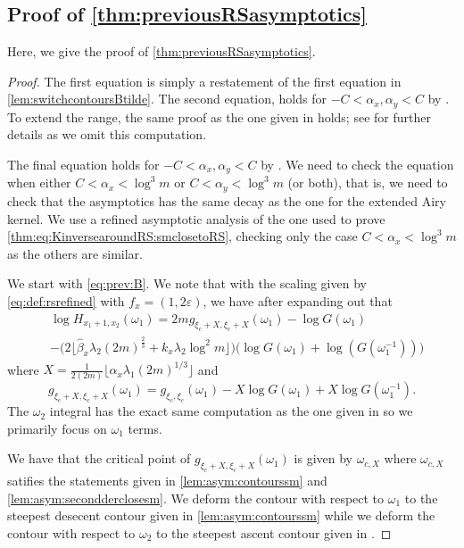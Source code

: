 \documentclass[11pt,twoside]{amsart}
\theoremstyle{plain}
\numberwithin{quest}{section}
\theoremstyle{remark}
\numberwithin{rem}{section}
\theoremstyle{definition}
\newcommand{\eps}{\varepsilon}
\begin{document}
	\subsection{Proof of \cref{thm:previousRSasymptotics}}
	\label{S:thmpreviousRSasymptotics}
	Here, we give the proof of \cref{thm:previousRSasymptotics}.  
	\begin{proof}
		The first equation is simply a restatement of the first equation in \cref{lem:switchcontoursBtilde}. The second equation, holds for $-C<\alpha_x,\alpha_y<C$ by \cite[Theorem 2.7]{CJ16}. To extend the range, the same proof as the one given in \cite[Proposition 3.4]{CJ16} holds; see \cite[Proposition 3.4]{CJ16} for further details as we omit this computation. 
		
		The final equation holds for $-C<\alpha_x,\alpha_y<C$ by \cite[Theorem 2.7]{CJ16}.  We need to check the equation when either $C<\alpha_x<\log^3 m$ or $C<\alpha_y<\log^3 m$ (or both), that is, we need to check that the asymptotics has the same decay as the one for the extended Airy kernel.  We use a refined asymptotic analysis of the one used to prove  \eqref{thm:eq:KinversearoundRS:smclosetoRS}, checking only the case $C<\alpha_x<\log^3 m$ as the others are similar.
		
		We start with \eqref{eq:prev:B}. We note that with the scaling given by \eqref{eq:def:rsrefined} with $f_x=(1,2\eps)$, we have after expanding out that 
		\begin{equation*}
			\begin{split}
				&\log H_{x_1+1,x_2}(\omega_1)=2m g_{\xi_c+X,\xi_c+X}(\omega_1)-\log G(\omega_1)\\
				&-\big(2\lfloor \hat{\beta}_x \lambda_2 (2m)^{\frac{2}{3}} +k_x \lambda_2 \log^2 m\rfloor \big) \big(\log G(\omega_1)+\log (G(\omega_1^{-1})) \big)
			\end{split}
		\end{equation*}
		where $X=\frac{1}{2(2m)}\lfloor  \alpha_x \lambda_1 (2m)^{1/3} \rfloor$ and 
		\begin{equation*}
			g_{\xi_c+X,\xi_c+X}(\omega_1)=g_{\xi_c,\xi_c}(\omega_1)-X\log G(\omega_1)+X\log G(\omega_1^{-1}).
		\end{equation*}
		The $\omega_2$ integral has the exact same computation as the one given in \cite[Proposition 3.17]{CJ16} so we primarily focus on $\omega_1$ terms. 
		
		We have that the critical point of $g_{\xi_c+X,\xi_c+X}(\omega_1)$ is given by $\omega_{c,X}$ where $\omega_{c,X}$ satifies the statements given in \cref{lem:asym:contourssm} and \cref{lem:asym:secondderclosesm}.   We deform the contour with respect to $\omega_1$ to the steepest desecent contour given in \cref{lem:asym:contourssm} while we deform the contour with respect to $\omega_2$ to the steepest ascent contour given in \cite[Lemma 3.15]{CJ16}. 
		

\end{proof}
\end{document}
